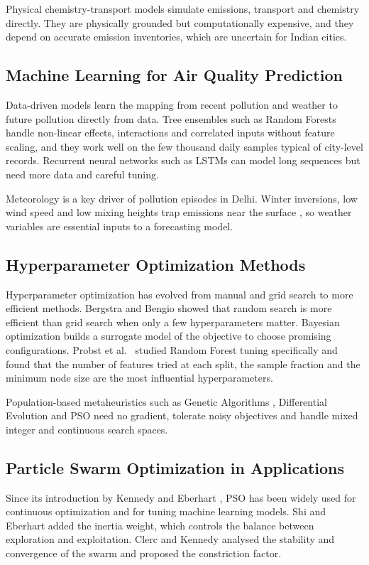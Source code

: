 Physical chemistry-transport models simulate emissions, transport and chemistry directly. They are physically grounded but computationally expensive, and they depend on accurate emission inventories, which are uncertain for Indian cities.

\subsection{Machine Learning for Air Quality Prediction}
Data-driven models learn the mapping from recent pollution and weather to future pollution directly from data. Tree ensembles such as Random Forests \cite{breiman2001} handle non-linear effects, interactions and correlated inputs without feature scaling, and they work well on the few thousand daily samples typical of city-level records. Recurrent neural networks such as LSTMs \cite{hochreiter1997} can model long sequences but need more data and careful tuning.

Meteorology is a key driver of pollution episodes in Delhi. Winter inversions, low wind speed and low mixing heights trap emissions near the surface \cite{guttikunda2012}, so weather variables are essential inputs to a forecasting model.

\subsection{Hyperparameter Optimization Methods}
Hyperparameter optimization has evolved from manual and grid search to more efficient methods. Bergstra and Bengio \cite{bergstra2012} showed that random search is more efficient than grid search when only a few hyperparameters matter. Bayesian optimization \cite{snoek2012} builds a surrogate model of the objective to choose promising configurations. Probst et al.\ \cite{probst2019} studied Random Forest tuning specifically and found that the number of features tried at each split, the sample fraction and the minimum node size are the most influential hyperparameters.

Population-based metaheuristics such as Genetic Algorithms \cite{holland1975}, Differential Evolution \cite{storn1997} and PSO \cite{kennedy1995} need no gradient, tolerate noisy objectives and handle mixed integer and continuous search spaces.

\subsection{Particle Swarm Optimization in Applications}
Since its introduction by Kennedy and Eberhart \cite{kennedy1995}, PSO has been widely used for continuous optimization and for tuning machine learning models. Shi and Eberhart \cite{shi1998} added the inertia weight, which controls the balance between exploration and exploitation. Clerc and Kennedy \cite{clerc2002} analysed the stability and convergence of the swarm and proposed the constriction factor.

